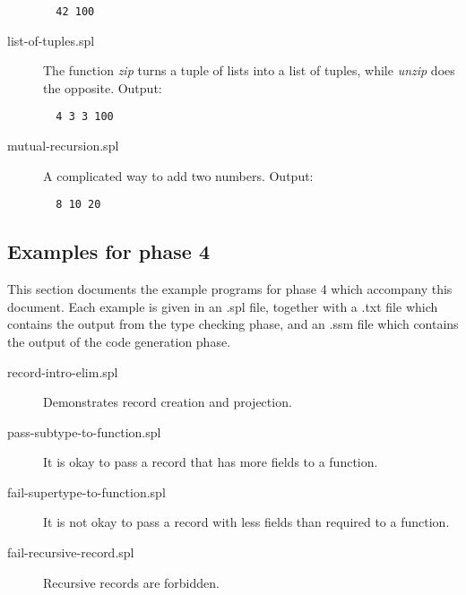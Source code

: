 \documentclass[a4paper]{article}
\begin{document}
\begin{description}
  \begin{verbatim}
  42 100
  \end{verbatim}

  \item[list-of-tuples.spl] The function \emph{zip} turns a tuple of lists into
  a list of tuples, while \emph{unzip} does the opposite. Output:

  \begin{verbatim}
  4 3 3 100
  \end{verbatim}

  \item[mutual-recursion.spl] A complicated way to add two numbers. Output:

  \begin{verbatim}
  8 10 20
  \end{verbatim}

\end{description}

\subsection{Examples for phase 4}
\label{sec_examplesPhase4}

This section documents the example programs for phase 4 which accompany this
document.  Each example is given in an .spl file, together with a .txt file
which contains the output from the type checking phase, and an .ssm file which
contains the output of the code generation phase.

\begin{description}

  \item[record-intro-elim.spl] Demonstrates record creation and projection.

  \item[pass-subtype-to-function.spl] It is okay to pass a record that has more
  fields to a function.

  \item[fail-supertype-to-function.spl] It is not okay to pass a record with
  less fields than required to a function.

  \item[fail-recursive-record.spl] Recursive records are forbidden.

\end{description}




\end{document}
